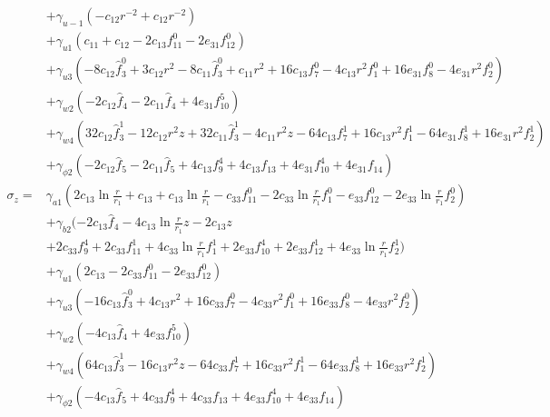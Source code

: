 \documentclass[12pt,sort&compress,fleqn,3p]{elsarticle}
\begin{document}
\begin{equation}
\begin{split}
&+\gamma_{u-1}( -c_{12} r^{-2} + c_{12}r^{-2}) \\
& + \gamma_{u1}( c_{11} + c_{12}  - 2c_{13}f^0_{11}  - 2e_{31}f^0_{12} )\\
&+ \gamma_{u3}( -8c_{12}\hat{f}^0_3+  3c_{12}r^2 -8c_{11}\hat{f}^0_3 +  c_{11}r^2  + 16 c_{13}f^0_7 - 4c_{13}r^2f^0_1  +  16e_{31}f^0_{8} - 4e_{31}r^2f^0_2 )\\
&+ \gamma_{w2}( -2c_{12}\hat{f}_4 -2c_{11}\hat{f}_4 + 4e_{31}f^5_{10} ) \\
& + \gamma_{w4}(  32c_{12}\hat{f}^1_3 -12c_{12}r^2z +  32c_{11}\hat{f}^1_3 -4c_{11}r^2z   -64c_{13}f^1_7 + 16c_{13}r^2f^1_1 -64e_{31}f^1_{8} + 16e_{31}r^2f^1_2     )\\
&+  \gamma_{\phi2} (  -2c_{12}\hat{f}_5 -2c_{11}\hat{f}_5 +   4c_{13}f^4_{9}+ 4c_{13}f_{13}  +  4e_{31}f^4_{10} +4e_{31}f_{14} )    \\
\sigma_{z} = &   \gamma_{a1} (   2c_{13}\ln\frac{r}{r_1} + c_{13}  + c_{13}\ln\frac{r}{r_1}    -c_{33}f^0_{11} -2c_{33}\ln\frac{r}{r_1} f^0_1  -e_{33}f^0_{12}  - 2e_{33}\ln\frac{r}{r_1}f^0_2  )\\
& + \gamma_{b2} ( - 2c_{13}\hat{f}_4 -4c_{13}\ln\frac{r}{r_1}z -2c_{13}z \\
& +2 c_{33} f^4_9 + 2 c_{33} f^1_{11} + 4   c_{33}  \ln\frac{r}{r_1} f^1_1 + 2 e_{33}f^4_{10} + 2 e_{33}f^1_{12} + 4 e_{33}\ln\frac{r}{r_1}f^1_2   )\\
& + \gamma_{u1}( 2c_{13}  - 2c_{33}f^0_{11}  - 2e_{33}f^0_{12} )\\
&+ \gamma_{u3}( -16c_{13}\hat{f}^0_3+  4c_{13}r^2  + 16 c_{33}f^0_7 - 4c_{33}r^2f^0_1  +  16e_{33}f^0_{8} - 4e_{33}r^2f^0_2 )\\
&+ \gamma_{w2}( -4c_{13}\hat{f}_4  + 4e_{33}f^5_{10} ) \\
& + \gamma_{w4}(  64c_{13}\hat{f}^1_3  -16c_{13}r^2z   -64c_{33}f^1_7 + 16c_{33}r^2f^1_1 -64e_{33}f^1_{8} + 16e_{33}r^2f^1_2)\\
&+  \gamma_{\phi2} (  -4c_{13}\hat{f}_5  +   4c_{33}f^4_{9}+ 4c_{33}f_{13}  +  4e_{33}f^4_{10} +4e_{33}f_{14} )    \\
\end{split}
\end{equation}
\end{document}
